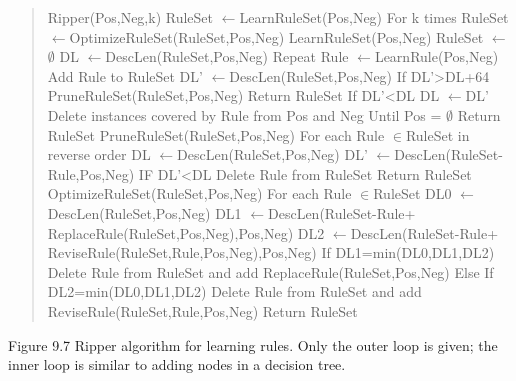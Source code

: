 \begin{quote}\small\raggedright
Ripper(Pos,Neg,k) RuleSet $\leftarrow$LearnRuleSet(Pos,Neg) For k times RuleSet $\leftarrow$OptimizeRuleSet(RuleSet,Pos,Neg) LearnRuleSet(Pos,Neg) RuleSet $\leftarrow$$\emptyset$ DL $\leftarrow$DescLen(RuleSet,Pos,Neg) Repeat Rule $\leftarrow$LearnRule(Pos,Neg) Add Rule to RuleSet DL’ $\leftarrow$DescLen(RuleSet,Pos,Neg) If DL’>DL+64 PruneRuleSet(RuleSet,Pos,Neg) Return RuleSet If DL’<DL DL $\leftarrow$DL’ Delete instances covered by Rule from Pos and Neg Until Pos = $\emptyset$ Return RuleSet PruneRuleSet(RuleSet,Pos,Neg) For each Rule $\in$RuleSet in reverse order DL $\leftarrow$DescLen(RuleSet,Pos,Neg) DL’ $\leftarrow$DescLen(RuleSet-Rule,Pos,Neg) IF DL’<DL Delete Rule from RuleSet Return RuleSet OptimizeRuleSet(RuleSet,Pos,Neg) For each Rule $\in$RuleSet DL0 $\leftarrow$DescLen(RuleSet,Pos,Neg) DL1 $\leftarrow$DescLen(RuleSet-Rule+ ReplaceRule(RuleSet,Pos,Neg),Pos,Neg) DL2 $\leftarrow$DescLen(RuleSet-Rule+ ReviseRule(RuleSet,Rule,Pos,Neg),Pos,Neg) If DL1=min(DL0,DL1,DL2) Delete Rule from RuleSet and add ReplaceRule(RuleSet,Pos,Neg) Else If DL2=min(DL0,DL1,DL2) Delete Rule from RuleSet and add ReviseRule(RuleSet,Rule,Pos,Neg) Return RuleSet
\par\end{quote}

Figure 9.7 Ripper algorithm for learning rules. Only the outer loop is given; the inner loop is similar to adding nodes in a decision tree.

